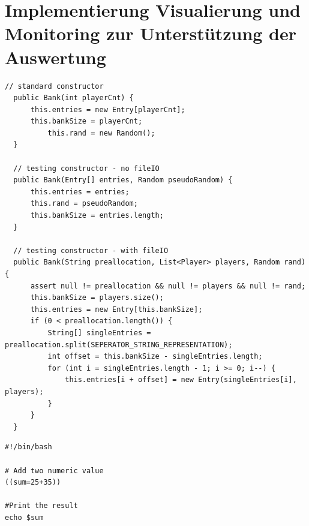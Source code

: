 %   
   
  


\section{Implementierung Visualierung und Monitoring zur Unterst\"utzung der Auswertung}


\begin{lstlisting}[style=javaStyle]
  // standard constructor 
  public Bank(int playerCnt) {
      this.entries = new Entry[playerCnt];
      this.bankSize = playerCnt;
          this.rand = new Random();
  }
  
  // testing constructor - no fileIO
  public Bank(Entry[] entries, Random pseudoRandom) {
      this.entries = entries;
      this.rand = pseudoRandom;
      this.bankSize = entries.length;
  }
  
  // testing constructor - with fileIO
  public Bank(String preallocation, List<Player> players, Random rand) {
      assert null != preallocation && null != players && null != rand;
      this.bankSize = players.size();
      this.entries = new Entry[this.bankSize];
      if (0 < preallocation.length()) {
          String[] singleEntries = preallocation.split(SEPERATOR_STRING_REPRESENTATION);
          int offset = this.bankSize - singleEntries.length;
          for (int i = singleEntries.length - 1; i >= 0; i--) {
              this.entries[i + offset] = new Entry(singleEntries[i], players);
          }
      }
  }
\end{lstlisting}


\begin{lstlisting}[style=bashStyle]
#!/bin/bash

# Add two numeric value
((sum=25+35))

#Print the result
echo $sum
\end{lstlisting}